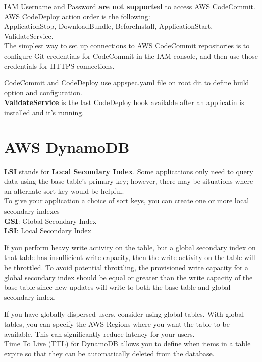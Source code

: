 \documentclass[12pt, letterpaper, twoside]{article}
\begin{document}
IAM Username and Password \textbf{are not supported} to access AWS CodeCommit.\\

AWS CodeDeploy action order is the following:\\
ApplicationStop, DownloadBundle, BeforeInstall, ApplicationStart, ValidateService.\\

The simplest way to set up connections to AWS CodeCommit repositories is to configure Git credentials for CodeCommit in the IAM 
console, and then use those credentials for HTTPS connections.

CodeCommit and CodeDeploy use appspec.yaml file on root dit to define build option
and configuration.\\
\textbf{ValidateService} is the last CodeDeploy hook available after an applicatin is installed and it's running.\\

\section{AWS DynamoDB}
\textbf{LSI} stands for \textbf{Local Secondary Index}. Some applications only need to query data using the base table's primary
key; however, there may be situations where an alternate sort key would be helpful.\\
To give your application a choice of sort keys, you can create one or more local secondary indexes\\

\textbf{GSI}: Global Secondary Index\\
\textbf{LSI}: Local Secondary Index

If you perform heavy write activity on the table, but a global secondary index on that table has insufficient write capacity, 
then the write activity on the table will be throttled. To avoid potential throttling, the provisioned write capacity for a 
global secondary index should be equal or greater than the write capacity of the base table since new updates will write to 
both the base table and global secondary index.

If you have globally dispersed users, consider using global tables. With global tables, you can specify the AWS Regions 
where you want the table to be available. This can significantly reduce latency for your users.\\

Time To Live (TTL) for DynamoDB allows you to define when items in a table expire so that they can be automatically deleted 
from the database.\\
\end{document}
